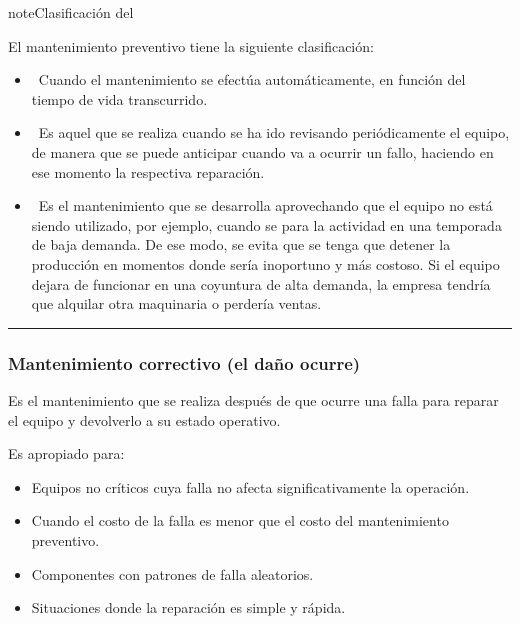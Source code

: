 \documentclass[letterpaper,10pt,spanish]{sphinxmanual}
\begin{document}
\begin{sphinxadmonition}{note}{Clasificación del }

\sphinxAtStartPar
El mantenimiento preventivo tiene la siguiente clasificación:
\begin{itemize}
\item {} 
\sphinxAtStartPar
{} Cuando el mantenimiento se efectúa automáticamente, en función del tiempo de vida transcurrido.

\item {} 
\sphinxAtStartPar
{} Es aquel que se realiza cuando se ha ido revisando periódicamente el equipo, de manera que se puede anticipar cuando va a ocurrir un fallo, haciendo en ese momento la respectiva reparación.

\item {} 
\sphinxAtStartPar
{} Es el mantenimiento que se desarrolla aprovechando que el equipo no está siendo utilizado, por ejemplo, cuando se para la actividad en una temporada de baja demanda. De ese modo, se evita que se tenga que detener la producción en momentos donde sería inoportuno y más costoso. Si el equipo dejara de funcionar en una coyuntura de alta demanda, la empresa tendría que alquilar otra maquinaria o perdería ventas.

\end{itemize}
\end{sphinxadmonition}


\bigskip\hrule\bigskip



\subsubsection{Mantenimiento correctivo (el daño ocurre)}
\label{\detokenize{1_guias/10informatica/G1004:mantenimiento-correctivo-el-dano-ocurre}}
\sphinxAtStartPar
Es el mantenimiento que se realiza después de que ocurre una falla para reparar el equipo y devolverlo a su estado operativo.

\sphinxAtStartPar
Es apropiado para:
\begin{itemize}
\item {} 
\sphinxAtStartPar
Equipos no críticos cuya falla no afecta significativamente la operación.

\item {} 
\sphinxAtStartPar
Cuando el costo de la falla es menor que el costo del mantenimiento preventivo.

\item {} 
\sphinxAtStartPar
Componentes con patrones de falla aleatorios.

\item {} 
\sphinxAtStartPar
Situaciones donde la reparación es simple y rápida.

\end{itemize}
\end{document}
